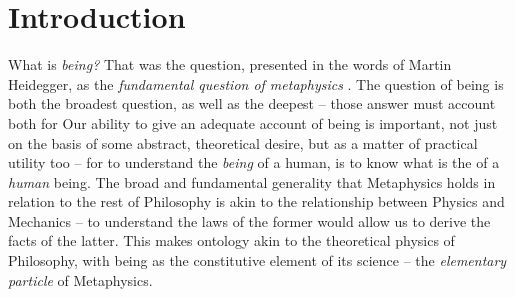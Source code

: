 \chapter{Introduction}





What is \emph{being?}  That was the question, presented in the words of Martin Heidegger, as the \emph{fundamental question of metaphysics} \autocite[1]{Heidegger}. The question of being is both the broadest question, as well as the deepest -- those answer must account both for  Our ability to give an adequate account of being is important, not just on the basis of some abstract, theoretical desire, but as a matter of practical utility too -- for to understand the \emph{being} of a human, is to know what is the  of a \emph{human} being. The broad and fundamental generality that Metaphysics holds in relation to the rest of Philosophy is akin to the relationship between Physics and Mechanics -- to understand the laws of the former would allow us to derive the facts of the latter. This makes ontology akin to the theoretical physics of Philosophy, with being as the constitutive element of its science -- the \emph{elementary particle} of Metaphysics.


